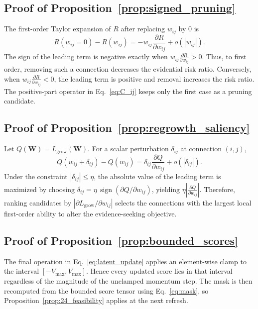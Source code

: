 \documentclass[letterpaper]{article} %
\begin{document}
\subsection{Proof of Proposition~\ref{prop:signed_pruning}}
The first-order Taylor expansion of $R$ after replacing $w_{ij}$ by $0$ is
\begin{equation}
    R(w_{ij}=0)-R(w_{ij})
    =
    -w_{ij}\frac{\partial R}{\partial w_{ij}}
    + o(|w_{ij}|).
\end{equation}
The sign of the leading term is negative exactly when $w_{ij}\frac{\partial R}{\partial w_{ij}}>0$. Thus, to first order, removing such a connection decreases the evidential risk ratio. Conversely, when $w_{ij}\frac{\partial R}{\partial w_{ij}}<0$, the leading term is positive and removal increases the risk ratio. The positive-part operator in Eq.~\ref{eq:C_ij} keeps only the first case as a pruning candidate.

\subsection{Proof of Proposition~\ref{prop:regrowth_saliency}}
Let $Q(\bm{W})=L_{\text{grow}}(\bm{W})$. For a scalar perturbation $\delta_{ij}$ at connection $(i,j)$,
\begin{equation}
    Q(w_{ij}+\delta_{ij})-Q(w_{ij})
    =
    \delta_{ij}\frac{\partial Q}{\partial w_{ij}}
    + o(|\delta_{ij}|).
\end{equation}
Under the constraint $|\delta_{ij}|\le\eta$, the absolute value of the leading term is maximized by choosing $\delta_{ij}=\eta\,\operatorname{sign}(\partial Q/\partial w_{ij})$, yielding $\eta\left|\frac{\partial Q}{\partial w_{ij}}\right|$. Therefore, ranking candidates by $\left|\partial L_{\text{grow}}/\partial w_{ij}\right|$ selects the connections with the largest local first-order ability to alter the evidence-seeking objective.

\subsection{Proof of Proposition~\ref{prop:bounded_scores}}
The final operation in Eq.~\ref{eq:latent_update} applies an element-wise clamp to the interval $[-V_{\max},V_{\max}]$. Hence every updated score lies in that interval regardless of the magnitude of the unclamped momentum step. The mask is then recomputed from the bounded score tensor using Eq.~\ref{eq:mask}, so Proposition~\ref{prop:24_feasibility} applies at the next refresh.
\end{document}
